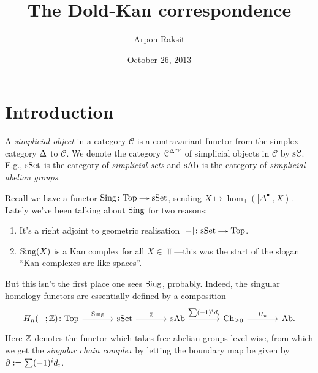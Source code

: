 


\title{The Dold-Kan correspondence}
\author{Arpon Raksit}
\date{October 26, 2013}


\maketitle
\thispagestyle{fancy}


\renewcommand{\C}{\mathcal{C}}

\section{Introduction}

\begin{definition}
  A \textit{simplicial object} in a category $\C$ is a contravariant
  functor from the simplex category $\Delta$ to $\C$. We denote the
  category $\C^{\Simplex^\op}$ of simplicial objects in $\C$ by
  $\s\C$. E.g., $\mathrm{s}\mathrm{Set}$ is the category of \textit{simplicial sets}
  and $\mathrm{s}\mathrm{Ab}$ is the category of \textit{simplicial abelian groups}.
\end{definition}

\begin{nothing}
  Recall we have a functor $\Sing \c \Top \to \s\Set$, sending $X
  \mapsto \hom_\Top(|\Delta^\bullet|, X)$. Lately we've been talking
  about $\operatorname{Sing}$ for two reasons:
  \begin{enumerate}
  \item It's a right adjoint to geometric realisation $|{-}| \c \s\Set
    \to \Top$.
  \item $\operatorname{Sing}(X)$ is a Kan complex for all $X \in \Top$---this was
    the start of the slogan ``Kan complexes are like spaces''.
  \end{enumerate}
  But this isn't the first place one sees $\operatorname{Sing}$, probably. Indeed,
  the singular homology functors are essentially defined by a
  composition
  \[
  \begin{tikzcd}[column sep = large]
    H_n(-;\Z) \c \Top \rar{\Sing} & \s\Set \rar{\Z} & \s\Ab \rar{\sum
      (-1)^i d_i} & \Ch_{\ge 0} \rar{H_n} & \Ab.
  \end{tikzcd}
  \]
  Here $\mathbb{Z}$ denotes the functor which takes free abelian groups
  level-wise, from which we get the \textit{singular chain complex} by
  letting the boundary map be given by $\partial \mathrel{:=} \sum (-1)^i
  d_i$.
\end{nothing}

